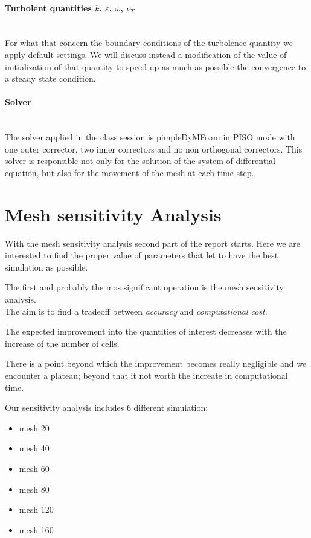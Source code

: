\documentclass[a4paper,12pt]{article}
\begin{document}
\paragraph{Turbolent quantities $k$, $\varepsilon$, $\omega$, $\nu_T$}\mbox{}\\
For what that concern the boundary conditions of the turbolence quantity we apply default settings.
We will discuss instead a modification of the value of initialization of that quantity to speed up as much as possible the convergence to a steady state condition.

\paragraph{Solver}\mbox{}\\
The solver applied in the class session is pimpleDyMFoam in PISO mode with one outer corrector, two inner correctors and no non orthogonal correctors. This solver is responsible not only for the solution of the system of differential equation, but also for the movement of the mesh at each time step. 

\section{Mesh sensitivity Analysis}
With the mesh sensitivity analysis second part of the report starts. Here we are interested to find the proper value of parameters that let to have the best simulation as possible.

The first and probably the mos significant operation is the mesh sensitivity analysis.
\\
The aim is to find a tradeoff between \emph{accuracy} and \emph{computational cost}. 

The expected improvement into the quantities of interest decreases with the increase of the number of cells.

There is a point beyond which the improvement becomes really negligible and we encounter a plateau; beyond that it not worth the increate in computational time. 

Our sensitivity analysis includes 6 different simulation:
\begin{itemize}
\item mesh 20
\item mesh 40
\item mesh 60
\item mesh 80
\item mesh 120
\item mesh 160
\end{itemize}
\end{document}
